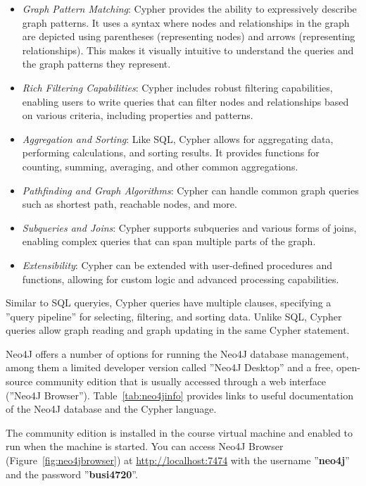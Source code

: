 \begin{itemize}
\item \emph{Graph Pattern Matching}: Cypher provides the ability to expressively describe graph patterns. It uses a syntax where nodes and relationships in the graph are depicted using parentheses (representing nodes) and arrows (representing relationships). This makes it visually intuitive to understand the queries and the graph patterns they represent.

\item \emph{Rich Filtering Capabilities}: Cypher includes robust filtering capabilities, enabling users to write queries that can filter nodes and relationships based on various criteria, including properties and patterns.

\item \emph{Aggregation and Sorting}: Like SQL, Cypher allows for aggregating data, performing calculations, and sorting results. It provides functions for counting, summing, averaging, and other common aggregations.

\item \emph{Pathfinding and Graph Algorithms}: Cypher can handle common graph queries such as shortest path, reachable nodes, and more.

\item \emph{Subqueries and Joins}: Cypher supports subqueries and various forms of joins, enabling complex queries that can span multiple parts of the graph.

\item \emph{Extensibility}: Cypher can be extended with user-defined procedures and functions, allowing for custom logic and advanced processing capabilities.
\end{itemize}

Similar to SQL queryies, Cypher queries have multiple clauses, specifying a ''query pipeline'' for selecting, filtering, and sorting data. Unlike SQL, Cypher queries allow graph reading and graph updating in the same Cypher statement. 

Neo4J offers a number of options for running the Neo4J database management, among them a limited developer version called ''Neo4J Desktop'' and a free, open-source community edition that is usually accessed through a web interface (''Neo4J Browser''). Table~\ref{tab:neo4jinfo} provides links to useful documentation of the Neo4J database and the Cypher language.

\begin{tcolorbox}[colback=alert]
The community edition is installed in the course virtual machine and enabled to run when the machine is started. You can access Neo4J Browser (Figure~\ref{fig:neo4jbrowser}) at \url{http://localhost:7474} with the username ''\textbf{neo4j}'' and the password ''\textbf{busi4720}''. 
\end{tcolorbox}

